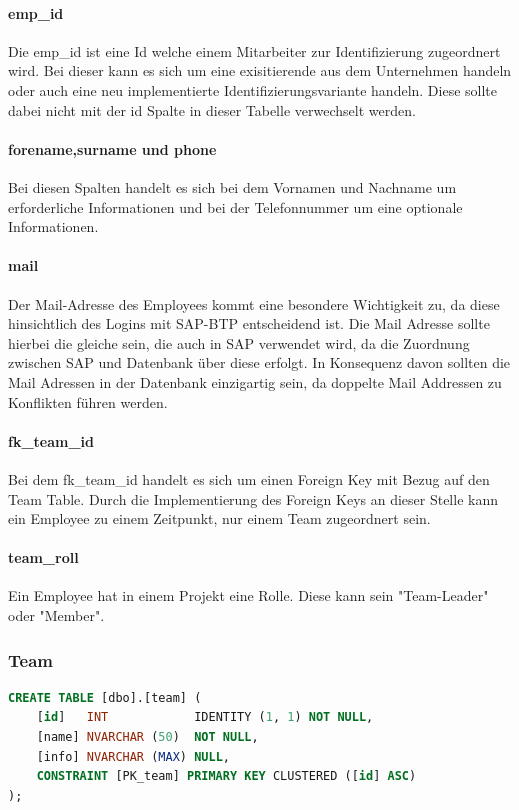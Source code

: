 \documentclass{article}
\begin{document}
\paragraph{emp\_id} Die emp\_id ist eine Id welche einem Mitarbeiter zur Identifizierung
zugeordnert wird. Bei dieser kann es sich um eine exisitierende aus dem
Unternehmen handeln oder auch eine neu implementierte Identifizierungsvariante
handeln. Diese sollte dabei nicht mit der id Spalte in dieser Tabelle
verwechselt werden.

\paragraph{forename,surname und phone} Bei diesen Spalten handelt es sich bei dem Vornamen und Nachname um
erforderliche Informationen und bei der Telefonnummer um eine optionale
Informationen.

\paragraph{mail} Der Mail-Adresse des Employees kommt eine besondere Wichtigkeit zu, da diese
hinsichtlich des Logins mit SAP-BTP entscheidend ist. Die Mail Adresse sollte
hierbei die gleiche sein, die auch in SAP verwendet wird, da die Zuordnung
zwischen SAP und Datenbank über diese erfolgt. In Konsequenz davon sollten die
Mail Adressen in der Datenbank einzigartig sein, da doppelte Mail Addressen zu
Konflikten führen werden.

\paragraph{fk\_team\_id}
\label{paragraph:fkTeamId} Bei dem fk\_team\_id handelt es sich um einen Foreign Key mit Bezug auf den Team Table. Durch die Implementierung des Foreign Keys an
dieser Stelle kann ein Employee zu einem Zeitpunkt, nur einem Team zugeordnert sein.

\paragraph{team\_roll}Ein Employee hat in einem Projekt eine Rolle. Diese kann sein "Team-Leader" oder "Member".

\subsubsection{Team}
\begin{lstlisting}[language=Sql, caption= Create Table Statement für Team Table]
    CREATE TABLE [dbo].[team] (
    [id]   INT            IDENTITY (1, 1) NOT NULL,
    [name] NVARCHAR (50)  NOT NULL,
    [info] NVARCHAR (MAX) NULL,
    CONSTRAINT [PK_team] PRIMARY KEY CLUSTERED ([id] ASC)
);

         \end{lstlisting}
\end{document}
